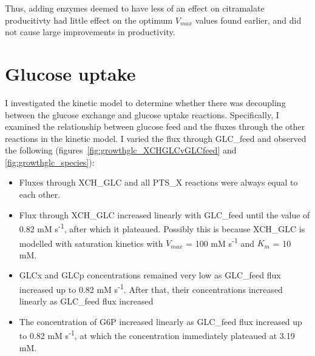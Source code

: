 \documentclass[parskip=full, numbers=noenddot]{scrreprt}
\begin{document}
Thus, adding enzymes deemed to have less of an effect on citramalate producitivty had little effect on the optimum $V_{max}$ values found earlier, and did not cause large improvements in productivity.

\section{Glucose uptake}
\label{sec:glucoseuptake}


I investigated the kinetic model to determine whether there was decoupling between the glucose exchange and glucose uptake reactions.
Specifically, I examined the relationship between glucose feed and the fluxes through the other reactions in the kinetic model. I varied the flux through GLC\_feed and observed the following (figures~\ref{fig:growthglc_XCHGLCvGLCfeed} and \ref{fig:growthglc_species}):

\begin{itemize}
\item Fluxes through XCH\_GLC and all PTS\_X reactions were always equal to each other.
\item Flux through XCH\_GLC increased linearly with GLC\_feed until the value of 0.82 mM s\textsuperscript{-1}, after which it plateaued. Possibly this is because XCH\_GLC is modelled with saturation kinetics with $V_{max}$ = 100 mM s\textsuperscript{-1} and $K_{m}$ = 10 mM.
\item GLCx and GLCp concentrations remained very low as GLC\_feed flux increased up to 0.82 mM s\textsuperscript{-1}. After that, their concentrations increased linearly as GLC\_feed flux increased
  \item The concentration of G6P increased linearly as GLC\_feed flux increased up to 0.82 mM s\textsuperscript{-1}, at which the concentration immediately plateaued at 3.19 mM.
\end{itemize}
\end{document}
